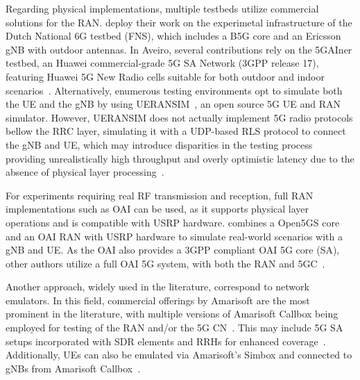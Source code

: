 \hide
{

Regarding physical implementations, multiple testbeds utilize commercial solutions for the \acs{RAN}. \citet{OnDemandNetworkQoSAdaptation} deploy their work on the experimetal infrastructure of the Dutch National \acs{6G} testbed (FNS), which includes a \acs{B5G} core and an Ericsson \acs{gNB} with outdoor antennas. In Aveiro, several contributions rely on the 5GAIner testbed, an Huawei commercial-grade \acs{5G SA} Network (3GPP release 17), featuring Huawei \acs{5G} New Radio cells suitable for both outdoor and indoor scenarios~\cite{5GAIner}. Alternatively, enumerous testing environments opt to simulate both the \acs{UE} and the \acs{gNB} by using UERANSIM~\citep{LoadBalancingConnectedVehicleServices,CloudEnabledDeployment5GN,DesignAndEvaluationNetworkDigitalTwin,NSSFfunction6GNetworksMLOPS}, an open source \acs{5G} \acs{UE} and \acs{RAN} simulator. However, UERANSIM does not actually implement \acs{5G} radio protocols bellow the \acs{RRC} layer, simulating it with a \acs{UDP}-based \acf{RLS} protocol to connect the \acs{gNB} and \acs{UE}, which may introduce disparities in the testing process providing unrealistically high throughput and overly optimistic latency due to the absence of physical layer processing~\cite{EvaluatingOpenSource5GSATestbeds}.

For experiments requiring real \acs{RF} transmission and reception, full \acs{RAN} implementations such as \acs{OAI} can be used, as it supports physical layer operations and is compatible with \acs{USRP} hardware. \citet{ExplorationNWDAFDevelopmentArchitecture6G} combines a Open5GS core and an \acs{OAI} \acs{RAN} with \acs{USRP} hardware to simulate real-world scenarios with a \acs{gNB} and \acs{UE}. As the \acs{OAI} also provides a 3GPP compliant \acs{OAI} \acs{5G} core (\acs{SA}), other authors utilize a full \acs{OAI} \acs{5G} system, with both the \acs{RAN} and \acs{5GC}~\cite{BenefitsCaveatsQoDNetworkAPIsVideoStreaming}. 

Another approach, widely used in the literature, correspond to network emulators. In this field, commercial offerings by Amarisoft are the most prominent in the literature, with multiple versions of Amarisoft Callbox being employed for testing of the \acs{RAN} and/or the \acs{5G} \acs{CN}~\citep{AdvancingPredictiveSecurity,PerformanceComparisonNWDAFSecurity}. This may include \acs{5G SA} setups incorporated with \acs{SDR} elements and \acfp{RRH} for enhanced coverage~\cite{VirtualOnBoardUnitMigration}. Additionally, \acsp{UE} can also be emulated via Amarisoft's Simbox and connected to \acsp{gNB} from Amarisoft Callbox~\cite{DemoOnDemand5GEdgeVerticalsViaThirdPartyUPF}.

}


